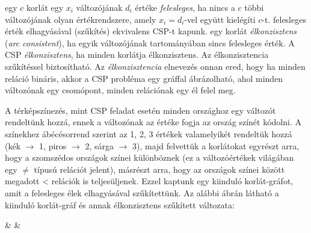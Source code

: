  egy $c$ korlát egy $x_i$ változójának $d_i$ értéke
  \emph{felesleges}, ha nincs a $c$ többi változójának olyan értékrendszere,
  amely $x_i=d_i$-vel együtt kielégíti $c$-t.
\br
\tetel felesleges érték elhagyásával (szűkítés) ekvivalens CSP-t kapunk.
\br
{} egy korlát \emph{élkonzisztens} (\emph{arc consistent}),
  ha egyik változójának tartományában sincs felesleges érték. A CSP
  \emph{élkonzisztens}, ha minden korlátja élkonzisztens. Az élkonzisztencia 
  szűkítéssel biztosítható.
\br
Az \emph{élkonzisztencia} elnevezés onnan ered, hogy ha minden reláció
bináris, akkor a CSP probléma egy gráffal ábrázolható, ahol minden változónak
egy csomópont, minden relációnak egy él felel meg.


A térképszínezés, mint CSP feladat esetén minden országhoz egy változót
rendeltünk hozzá, ennek a változónak az értéke fogja az ország színét
kódolni. A színekhez ábécésorrend szerint az 1, 2, 3 értékek valamelyikét
rendeltük hozzá (kék $\to$ 1, piros $\to$ 2, sárga $\to$ 3), majd felvettük a
korlátokat egyrészt arra, hogy a szomszédos országok színei különböznek (ez a
változóértékek világában egy $\neq$ típusú relációt jelent), másrészt arra, hogy
az országok színei között megadott < relációk is teljesüljenek. Ezzel
kaptunk egy kiinduló korlát-gráfot, amit a felesleges élek elhagyásával
szűkítettünk. Az alábbi ábrán látható a kiinduló korlát-gráf és annak
élkonzisztens szűkített változata:

 & &
\etab

